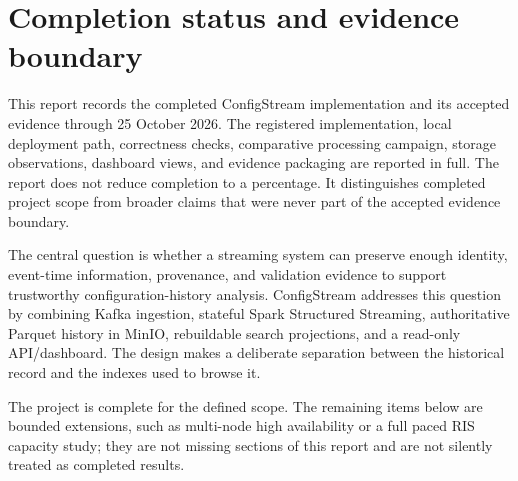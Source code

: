 \documentclass[a4paper,11pt]{article}
\begin{document}

\section{Completion status and evidence boundary}

This report records the completed ConfigStream implementation and its accepted evidence through 25 October 2026. The registered implementation, local deployment path, correctness checks, comparative processing campaign, storage observations, dashboard views, and evidence packaging are reported in full. The report does not reduce completion to a percentage. It distinguishes completed project scope from broader claims that were never part of the accepted evidence boundary.

The central question is whether a streaming system can preserve enough identity, event-time information, provenance, and validation evidence to support trustworthy configuration-history analysis. ConfigStream addresses this question by combining Kafka ingestion, stateful Spark Structured Streaming, authoritative Parquet history in MinIO, rebuildable search projections, and a read-only API/dashboard. The design makes a deliberate separation between the historical record and the indexes used to browse it.

The project is complete for the defined scope. The remaining items below are bounded extensions, such as multi-node high availability or a full paced RIS capacity study; they are not missing sections of this report and are not silently treated as completed results.
\end{document}
